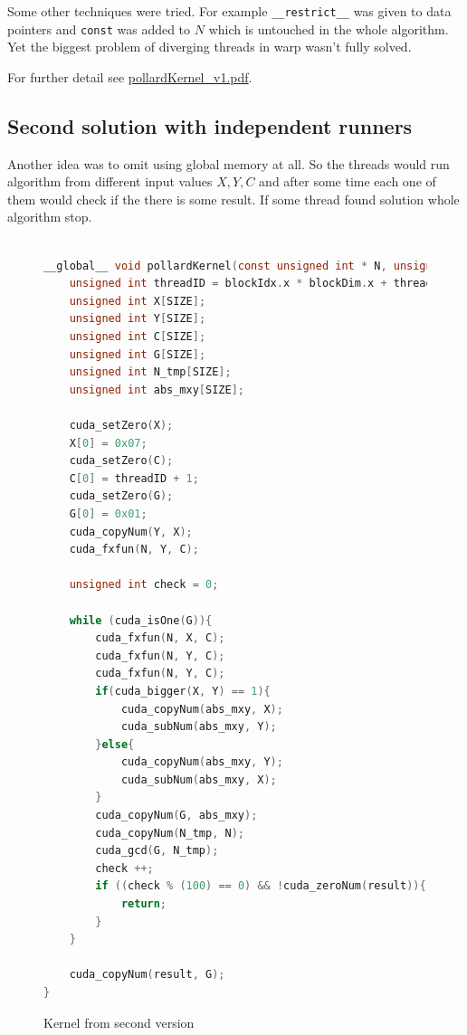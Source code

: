 \documentclass[a4paper]{article}
\begin{document}
Some other techniques were tried. For example \texttt{\_\_restrict\_\_} was given to data pointers and \texttt{const} was added to $N$ which is untouched in the whole algorithm. Yet the biggest problem of diverging threads in warp wasn't fully solved.

For further detail see \url{pollardKernel_v1.pdf}.

\subsection{Second solution with independent runners}

Another idea was to omit using global memory at all. So the threads would run algorithm from different input values $X, Y, C$ and after some time each one of them would check if the there is some result. If some thread found solution whole algorithm stop.


\begin{figure}[H]
	\centering
	\begin{lstlisting}[language=c,basicstyle=\small]

__global__ void pollardKernel(const unsigned int * N, unsigned int * result){
    unsigned int threadID = blockIdx.x * blockDim.x + threadIdx.x;
    unsigned int X[SIZE];
    unsigned int Y[SIZE];
    unsigned int C[SIZE];
    unsigned int G[SIZE];
    unsigned int N_tmp[SIZE];
    unsigned int abs_mxy[SIZE];
    
    cuda_setZero(X);
    X[0] = 0x07;
    cuda_setZero(C);
    C[0] = threadID + 1;
    cuda_setZero(G);
    G[0] = 0x01;
    cuda_copyNum(Y, X);
    cuda_fxfun(N, Y, C);
   
    unsigned int check = 0;

    while (cuda_isOne(G)){
        cuda_fxfun(N, X, C);
        cuda_fxfun(N, Y, C);
        cuda_fxfun(N, Y, C);
        if(cuda_bigger(X, Y) == 1){
            cuda_copyNum(abs_mxy, X);
            cuda_subNum(abs_mxy, Y);
        }else{
            cuda_copyNum(abs_mxy, Y);
            cuda_subNum(abs_mxy, X);    
        }
        cuda_copyNum(G, abs_mxy);
        cuda_copyNum(N_tmp, N);
        cuda_gcd(G, N_tmp);
        check ++;
        if ((check % (100) == 0) && !cuda_zeroNum(result)){
            return;
        }
    }
    
    cuda_copyNum(result, G);    
}

	\end{lstlisting}
	\caption{Kernel from second version}
	\label{kernelv2}
\end{figure}
\end{document}
